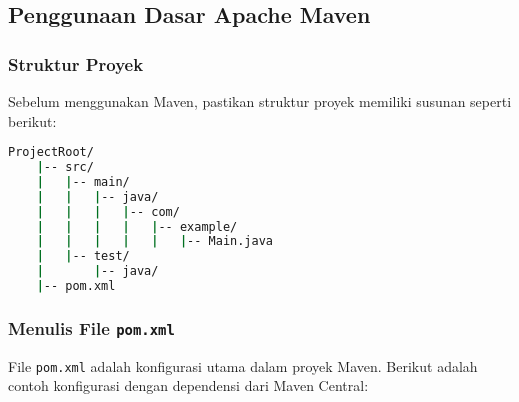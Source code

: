 \subsection{Penggunaan Dasar Apache Maven}
\subsubsection{Struktur Proyek}
Sebelum menggunakan Maven, pastikan struktur proyek memiliki susunan seperti berikut:

\begin{lstlisting}[language=bash]
	ProjectRoot/
	|-- src/
	|   |-- main/
	|   |   |-- java/
	|   |   |   |-- com/
	|   |   |   |   |-- example/
	|   |   |   |   |   |-- Main.java
	|   |-- test/
	|       |-- java/
	|-- pom.xml
\end{lstlisting}

\subsubsection{Menulis File \texttt{pom.xml}}
File \texttt{pom.xml} adalah konfigurasi utama dalam proyek Maven. Berikut adalah contoh konfigurasi dengan dependensi dari Maven Central:

